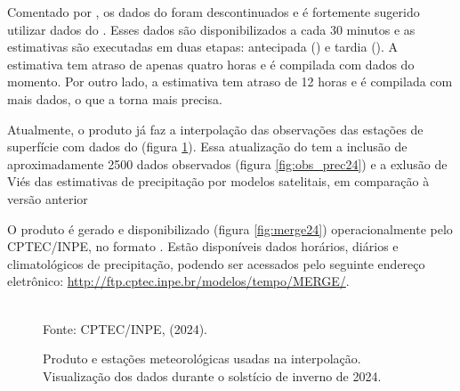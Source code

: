 \indent Comentado por , os dados do  foram descontinuados e é fortemente sugerido utilizar dados do . Esses dados são disponibilizados a cada 30 minutos e as estimativas são executadas em duas etapas: antecipada () e tardia (). A estimativa  tem atraso de apenas quatro horas e é compilada com dados do momento. Por outro lado, a estimativa  tem atraso de 12 horas e é compilada com mais dados, o que a torna mais precisa.

\indent Atualmente, o produto  já faz a interpolação das observações das estações de superfície com dados do  (figura \ref{fig:merge_obs24}). Essa atualização do  tem a inclusão de aproximadamente 2500 dados observados (figura \ref{fig:obs_prec24}) e a exlusão de Viés das estimativas de precipitação por modelos satelitais, em comparação à versão anterior \cite{MERGEatual}

\indent O produto é gerado e disponibilizado (figura \ref{fig:merge24}) operacionalmente pelo \acrshort{CPTEC}/\acrshort{INPE}, no formato . Estão disponíveis dados horários, diários e climatológicos de precipitação, podendo ser acessados pelo seguinte endereço eletrônico: \url{http://ftp.cptec.inpe.br/modelos/tempo/MERGE/}.

\begin{figure}[htbp]
    \centering
    \caption{Produto  e estações meteorológicas usadas na interpolação. Visualização dos dados durante o solstício de inverno de 2024.} %
    \label{fig:merge_obs24}
    \hfill
    \\
    \small{Fonte: \acrshort{CPTEC}/\acrshort{INPE}, \citeauthor{MERGEatual} (2024).}
\end{figure}

\subsection{}

